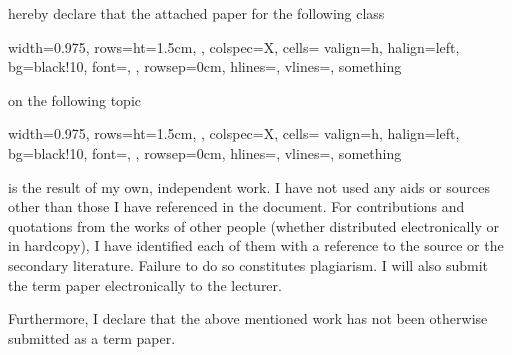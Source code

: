 {\vspace{0.2cm}

hereby declare that the attached paper for the following class

\vspace{-0.3cm}

\begin{center}
    \begin{tblr}{
        width=0.975\linewidth,
        rows={ht=1.5cm, },
        colspec={X},
        cells= {
            valign=h,
            halign=left,
            bg=black!10,
            font=\scriptsize,
            },
        rowsep=0cm,
        hlines={},
        vlines={},
    }
    something\\
    \end{tblr}
\end{center}


\vspace{-0.1cm}

on the following topic

\vspace{-0.3cm}

\begin{center}
    \begin{tblr}{
        width=0.975\linewidth,
        rows={ht=1.5cm, },
        colspec={X},
        cells= {
            valign=h, 
            halign=left, 
            bg=black!10,
            font=\scriptsize,
            },
        rowsep=0cm,
        hlines={},
        vlines={},
    }
    something\\
    \end{tblr}
\end{center}


\vspace{0.3cm}


is the result of my own, independent work. I have not used any aids or sources other than those I have referenced in the document. For contributions and quotations from the works of other people (whether distributed electronically or in hardcopy), I have identified each of them with a reference to the source or the secondary literature. Failure to do so constitutes plagiarism. I will also submit the term paper electronically to the lecturer.\\

\vspace{\baselineskip}

Furthermore, I declare that the above mentioned work has not been
otherwise submitted as a term paper.\\

}

